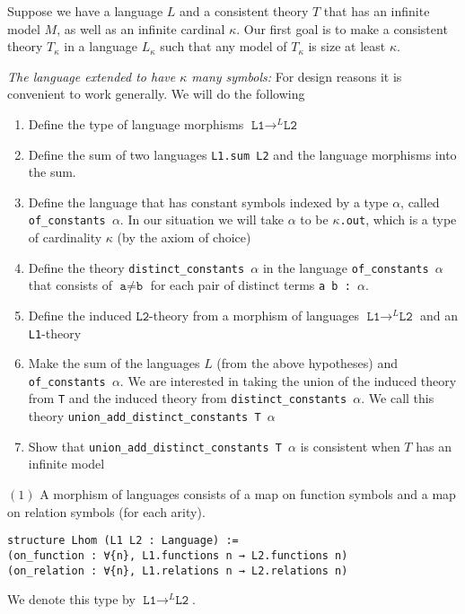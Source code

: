 \documentclass{article}
\newcommand{\al}{\alpha}
\newcommand{\ka}{\kappa}
\newcommand{\<}{\langle}
\renewcommand{\>}{\rangle}
\theoremstyle{definitionstyle}
\theoremstyle{exercisestyle}
\theoremstyle{remarkstyle}
\begin{document}
Suppose we have a language $L$ and a consistent theory $T$ that has
an infinite model $M$, as well as an infinite cardinal $\kappa$.
Our first goal is to make a consistent theory $T_\kappa$
in a language $L_{\kappa}$ such that any model of $T_{\kappa}$
is size at least $\kappa$.

\textit{The language extended to have $\kappa$ many symbols:}
For design reasons it is convenient to work generally.
We will do the following
\begin{enumerate}
  \item Define the type of language morphisms $\texttt{L1} \to^{L} \texttt{L2}$
  \item Define the sum of two languages \texttt{L1.sum L2}
        and the language morphisms into the sum.
  \item Define the language that has constant symbols indexed by a type $\al$,
        called \texttt{of\_constants $\al$}.
        In our situation we will take $\al$ to be \texttt{$\ka$.out},
        which is a type of cardinality $\kappa$ (by the axiom of choice)
  \item Define the theory \texttt{distinct\_constants $\al$}
        in the language \texttt{of\_constants $\al$}
        that consists of $\texttt{a} \ne \texttt{b}$
        for each pair of distinct terms \texttt{a b : $\al$}.
  \item Define the induced $\texttt{L2}$-theory
        from a morphism of languages $\texttt{L1} \to^{L} \texttt{L2}$ and
        an \texttt{L1}-theory
  \item Make the sum of the languages $L$ (from the above hypotheses)
        and \texttt{of\_constants $\al$}.
        We are interested in taking the union of the induced theory from \texttt{T}
        and the induced theory from
        \texttt{distinct\_constants $\al$}.
        We call this theory \texttt{union\_add\_distinct\_constants T $\al$}
  \item Show that \texttt{union\_add\_distinct\_constants T $\al$} is consistent
        when $T$ has an infinite model
\end{enumerate}

$(1)$ A morphism of languages consists of a map on function symbols
and a map on relation symbols (for each arity).
\begin{lstlisting}
structure Lhom (L1 L2 : Language) :=
(on_function : ∀{n}, L1.functions n → L2.functions n)
(on_relation : ∀{n}, L1.relations n → L2.relations n) \end{lstlisting}
We denote this type by $\texttt{L1} \to^{L} \texttt{L2}$.
\end{document}
